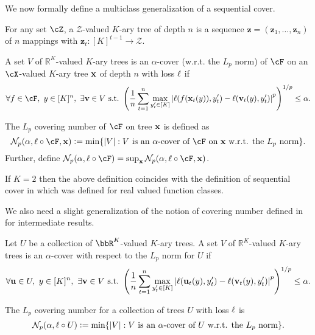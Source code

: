 
We now formally define a multiclass generalization of a sequential cover.

\begin{definition}
For any set $\cZ$, a $\mathcal{Z}$-valued $K$-ary tree of depth $n$ is a sequence $\mathbf{z} = (\mathbf{z}_1,\ldots,\mathbf{z}_n)$ of $n$ mappings with $\mathbf{z}_t: [K]^{t-1} \to \mathcal{Z}$. 
\end{definition}
\begin{definition}\label{def:cover}
A set $V$  of $\mathbb{R}^K$-valued $K$-ary trees is an $\alpha$-cover (w.r.t. the $L_p$ norm) of $\F$ on an $\X$-valued $K$-ary tree $\x$ of depth $n$ with loss $\ls$ if
$$
\forall f \in \F, ~y \in [K]^n,  ~\exists \vv \in V ~\textnormal{s.t.}~ \left(\frac{1}{n} \sum_{t=1}^n \max_{y'_t\in\brk*{K}}\left|\ell(f(\x_t(y)),y'_t) - \ell(\vv_t(y),y'_t) \right|^p\right)^{1/p} \le \alpha.
$$ 
\end{definition}
\begin{definition}
The $L_p$ covering number of $\F$ on tree $\x$ is defined as
$$
\mathcal{N}_p(\alpha,\ell \circ \F,\x) \ldef \min\{|V| : V \textrm{ is an }\alpha\textnormal{-cover of $\cF$ on $\x$ w.r.t. the $L_p$ norm} \}.
$$
Further, define $\mathcal{N}_p(\alpha,\ell \circ \F) = \sup_\x \mathcal{N}_p(\alpha,\ell \circ \F,\x)$. 
\end{definition}
If $K = 2$ then the above definition coincides with the definition of sequential cover in \cite{RakSriTew14jmlr} which was defined for real valued function classes. 


  
We also need a slight generalization of the notion of covering number defined in  for intermediate results.
  
  \begin{definition}\label{def:cover_general}
  Let $U$ be a collection of $\bbR^{K}$-valued $K$-ary trees. A set $V$  of $\mathbb{R}^K$-valued $K$-ary trees is an $\alpha$-cover with respect to the $L_p$ norm for $U$ if
\[
\forall \uu\in{}U, ~y \in [K]^n,  ~\exists \vv \in V ~\textnormal{s.t.}~ \left(\frac{1}{n} \sum_{t=1}^n \max_{y'_t\in\brk*{K}}\left|\ell(\uu_t(y),y'_t) - \ell(\vv_t(y),y'_t) \right|^p\right)^{1/p} \le \alpha.
\]
\end{definition}
\begin{definition}
\label{def:covering_number_general}
The $L_p$ covering number for a collection of trees $U$ with loss $\ls$ is
\[
\mathcal{N}_p(\alpha, \ls\circ{}U) \ldef \min\{|V| : V \textrm{ is an }\alpha\textnormal{-cover of $U$ w.r.t. the } L_p\textnormal{ norm} \}.
\]
\end{definition}

